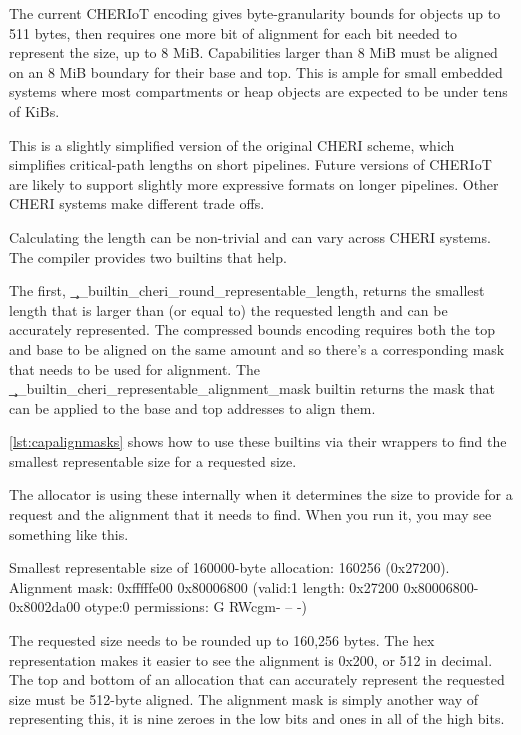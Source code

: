 {{{{{{{{\begin{note}
The current CHERIoT encoding gives byte-granularity bounds for objects up to 511 bytes, then requires one more bit of alignment for each bit needed to represent the size, up to 8 MiB.
Capabilities larger than 8 MiB must be aligned on an 8 MiB boundary for their base and top.
This is ample for small embedded systems where most compartments or heap objects are expected to be under tens of KiBs.

This is a slightly simplified version of the original CHERI scheme, which simplifies critical-path lengths on short pipelines.
Future versions of CHERIoT are likely to support slightly more expressive formats on longer pipelines.
Other CHERI systems make different trade offs.
\end{note}


Calculating the length can be non-trivial and can vary across CHERI systems.
The compiler provides two builtins that help.

The first, \c{__builtin_cheri_round_representable_length}, returns the smallest length that is larger than (or equal to) the requested length and can be accurately represented.
The compressed bounds encoding requires both the top and base to be aligned on the same amount and so there's a corresponding mask that needs to be used for alignment.
The \c{__builtin_cheri_representable_alignment_mask} builtin returns the mask that can be applied to the base and top addresses to align them.

\ref{lst:capalignmasks} shows how to use these builtins via their wrappers to find the smallest representable size for a requested size.

\codelisting[filename=examples/bounds_lengths/example.c,marker=representable_range,label=lst:capalignmasks,caption="Rounding up sizes for representable allocations."]{}

The allocator is using these internally when it determines the size to provide for a request and the alignment that it needs to find.
When you run it, you may see something like this.

\begin{console}
Smallest representable size of 160000-byte allocation: 160256 (0x27200). Alignment mask: 0xfffffe00
0x80006800 (valid:1 length: 0x27200 0x80006800-0x8002da00 otype:0 permissions: G RWcgm- -- -)
\end{console}

The requested size needs to be rounded up to 160,256 bytes.
The hex representation makes it easier to see the alignment is 0x200, or 512 in decimal.
The top and bottom of an allocation that can accurately represent the requested size must be 512-byte aligned.
The alignment mask is simply another way of representing this, it is nine zeroes in the low bits and ones in all of the high bits.

}}}}}}}}
